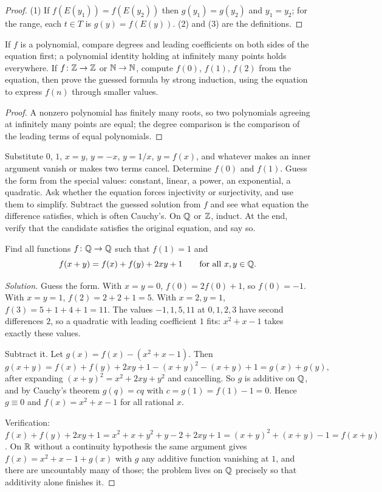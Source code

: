 \begin{proof}
(1) If $f(E(y_1))=f(E(y_2))$ then $g(y_1)=g(y_2)$ and $y_1=y_2$; for the range, each $t\in T$ is $g(y)=f(E(y))$. (2) and (3) are the definitions.
\end{proof}

\begin{proposition}
If $f$ is a polynomial, compare degrees and leading coefficients on both sides of the equation first; a polynomial identity holding at infinitely many points holds everywhere. If $f\colon\mathbb{Z}\to\mathbb{Z}$ or $\mathbb{N}\to\mathbb{N}$, compute $f(0)$, $f(1)$, $f(2)$ from the equation, then prove the guessed formula by strong induction, using the equation to express $f(n)$ through smaller values.
\end{proposition}

\begin{proof}
A nonzero polynomial has finitely many roots, so two polynomials agreeing at infinitely many points are equal; the degree comparison is the comparison of the leading terms of equal polynomials.
\end{proof}

\begin{firstmoves}
Substitute $0$, $1$, $x=y$, $y=-x$, $y=1/x$, $y=f(x)$, and whatever makes an inner argument vanish or makes two terms cancel. Determine $f(0)$ and $f(1)$. Guess the form from the special values: constant, linear, a power, an exponential, a quadratic. Ask whether the equation forces injectivity or surjectivity, and use them to simplify. Subtract the guessed solution from $f$ and see what equation the difference satisfies, which is often Cauchy's. On $\mathbb{Q}$ or $\mathbb{Z}$, induct. At the end, verify that the candidate satisfies the original equation, and say so.
\end{firstmoves}

\begin{example}
Find all functions $f\colon\mathbb{Q}\to\mathbb{Q}$ such that $f(1)=1$ and
\[
f(x+y)=f(x)+f(y)+2xy+1\qquad\text{for all }x,y\in\mathbb{Q}.
\]
\end{example}

\begin{proof}[Solution]
Guess the form. With $x=y=0$, $f(0)=2f(0)+1$, so $f(0)=-1$. With $x=y=1$, $f(2)=2+2+1=5$. With $x=2,y=1$, $f(3)=5+1+4+1=11$. The values $-1,1,5,11$ at $0,1,2,3$ have second differences $2$, so a quadratic with leading coefficient $1$ fits: $x^2+x-1$ takes exactly these values.

Subtract it. Let $g(x)=f(x)-(x^2+x-1)$. Then
\[
g(x+y)=f(x)+f(y)+2xy+1-(x+y)^2-(x+y)+1=g(x)+g(y),
\]
after expanding $(x+y)^2=x^2+2xy+y^2$ and cancelling. So $g$ is additive on $\mathbb{Q}$, and by Cauchy's theorem $g(q)=cq$ with $c=g(1)=f(1)-1=0$. Hence $g\equiv0$ and $f(x)=x^2+x-1$ for all rational $x$.

Verification: $f(x)+f(y)+2xy+1=x^2+x+y^2+y-2+2xy+1=(x+y)^2+(x+y)-1=f(x+y)$. On $\mathbb{R}$ without a continuity hypothesis the same argument gives $f(x)=x^2+x-1+g(x)$ with $g$ any additive function vanishing at $1$, and there are uncountably many of those; the problem lives on $\mathbb{Q}$ precisely so that additivity alone finishes it.
\end{proof}


